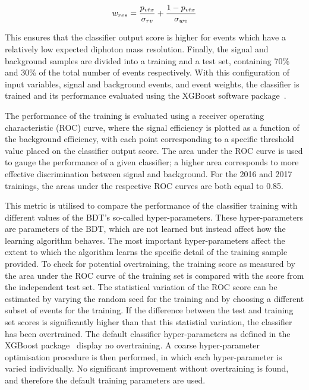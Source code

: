\begin{equation}
  w_{res} = \frac{p_{vtx}}{\sigma_{rv}} + \frac{1-p_{vtx}}{\sigma_{wv}}
\end{equation}

This ensures that the classifier output score is higher for events 
which have a relatively low expected diphoton mass resolution.
Finally, the signal and background samples are divided into a training and a test set,
containing 70\% and 30\% of the total number of events respectively.
With this configuration of input variables, signal and background events, and event weights, 
the classifier is trained and its performance evaluated using the XGBoost software package~\cite{XGBoost}.

The performance of the training is evaluated using a receiver operating characteristic (ROC) curve, 
where the signal efficiency is plotted as a function of the background efficiency,
with each point corresponding to a specific threshold value placed on the classifier output score.
The area under the ROC curve is used to gauge the performance of a given classifier; 
a higher area corresponds to more effective discrimination between signal and background.
For the 2016 and 2017 trainings, the areas under the respective ROC curves are both equal to 0.85.

This metric is utilised to compare the performance of the classifier training 
with different values of the BDT's so-called hyper-parameters.
These hyper-parameters are parameters of the BDT, 
which are not learned but instead affect how the learning algorithm behaves.
The most important hyper-parameters affect the extent to which 
the algorithm learns the specific detail of the training sample provided.
To check for potential overtraining, the training score as measured by the area under the ROC curve 
of the training set is compared with the score from the independent test set.
The statistical variation of the ROC score can be estimated by varying 
the random seed for the training and by choosing a different subset of events for the training.
If the difference between the test and training set scores is significantly higher 
than that this statistial variation, the classifier has been overtrained.
The default classifier hyper-parameters as defined 
in the XGBoost package~\cite{XGBoost} display no overtraining.
A coarse hyper-parameter optimisation procedure is then performed, 
in which each hyper-parameter is varied individually.
No significant improvement without overtraining is found, 
and therefore the default training parameters are used.

